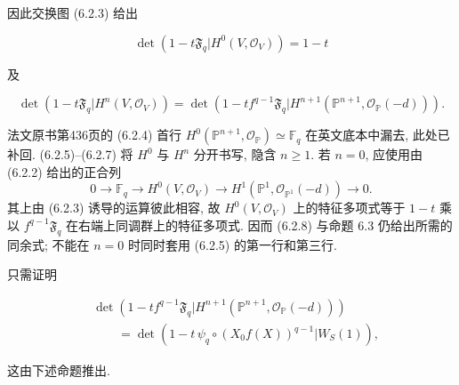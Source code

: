 因此交换图 (6.2.3) 给出

\begin{equation}\tag{6.2.6}
\det\!\left(1-t\mathfrak F_q
\mathrel{\Big|}H^0(V,\mathcal O_V)\right)=1-t
\end{equation}

及

\begin{equation}\tag{6.2.7}
\det\!\left(1-t\mathfrak F_q
\mathrel{\Big|}H^n(V,\mathcal O_V)\right)
=
\det\!\left(
1-tf^{q-1}\mathfrak F_q
\mathrel{\Big|}
H^{n+1}(\mathbb P^{n+1},\mathcal O_{\mathbb P}(-d))
\right).
\end{equation}

\begin{editorialnote}
法文原书第436页的 (6.2.4) 首行 $H^0(\mathbb P^{n+1},\mathcal O_{\mathbb P})\simeq\mathbb F_q$
在英文底本中漏去, 此处已补回. (6.2.5)--(6.2.7) 将 $H^0$ 与 $H^n$ 分开书写, 隐含 $n\geq1$.
若 $n=0$, 应使用由 (6.2.2) 给出的正合列
\[
0\longrightarrow\mathbb F_q\longrightarrow H^0(V,\mathcal O_V)
\longrightarrow H^1(\mathbb P^1,\mathcal O_{\mathbb P^1}(-d))\longrightarrow0.
\]
其上由 (6.2.3) 诱导的运算彼此相容, 故 $H^0(V,\mathcal O_V)$ 上的特征多项式等于
$1-t$ 乘以 $f^{q-1}\mathfrak F_q$ 在右端上同调群上的特征多项式.
因而 (6.2.8) 与命题 6.3 仍给出所需的同余式; 不能在 $n=0$ 时同时套用 (6.2.5) 的第一行和第三行.
\end{editorialnote}

只需证明

\begin{equation}\tag{6.2.8}
\begin{aligned}
&\det\!\left(
1-tf^{q-1}\mathfrak F_q
\mathrel{\Big|}
H^{n+1}(\mathbb P^{n+1},\mathcal O_{\mathbb P}(-d))
\right)\\
&\qquad=
\det\!\left(
1-t\,\psi_q\circ(X_0f(X))^{q-1}
\mathrel{\Big|}W_S(1)
\right),
\end{aligned}
\end{equation}

这由下述命题推出.

